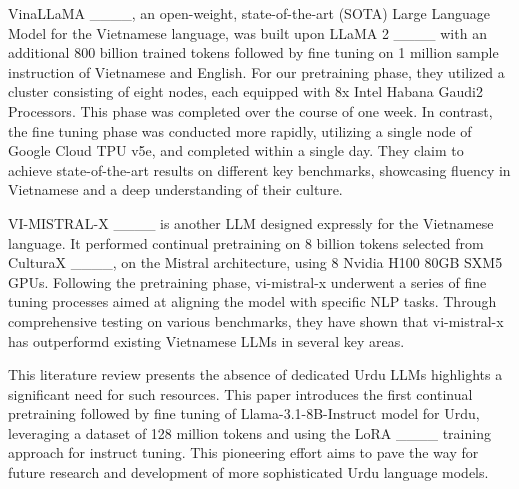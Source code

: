 \begin{table*}[ht]
    \centering
    \caption{Summary of Token Count Reduction Across Different Data Sources for Urdu-LLaMA}
    \label{tab:token_reduction}
    \renewcommand{\arraystretch}{1.5} %
\end{table*}
VinaLLaMA ____, an open-weight, state-of-the-art (SOTA) Large Language Model for the Vietnamese language, was built upon LLaMA 2 ____ with an additional 800 billion trained tokens followed by fine tuning on 1 million sample instruction of Vietnamese and English. For our pretraining phase, they utilized a cluster consisting of eight nodes, each equipped with 8x Intel Habana Gaudi2 Processors. This phase was completed over the course of one week. In contrast, the fine tuning phase was conducted more rapidly, utilizing a single node of Google Cloud TPU v5e, and completed within a single day. They claim to achieve state-of-the-art results on different key benchmarks, showcasing fluency in Vietnamese and a deep understanding of their culture.

VI-MISTRAL-X ____ is another LLM designed expressly for the Vietnamese language. It performed continual pretraining on 8 billion tokens selected from CulturaX ____, on the Mistral architecture, using 8 Nvidia H100 80GB SXM5
GPUs. Following the pretraining phase, vi-mistral-x underwent a series of fine tuning processes aimed at aligning the model
with specific NLP tasks. Through comprehensive testing
on various benchmarks, they have shown that vi-mistral-x has  outperformd existing Vietnamese LLMs in several
key areas.

This literature review presents the absence of dedicated Urdu LLMs highlights a significant need for such resources. This paper introduces the first continual pretraining followed by fine tuning of Llama-3.1-8B-Instruct model for Urdu, leveraging a dataset of 128 million tokens and using the LoRA ____ training approach for instruct tuning. This pioneering effort aims to pave the way for future research and development of more sophisticated Urdu language models.